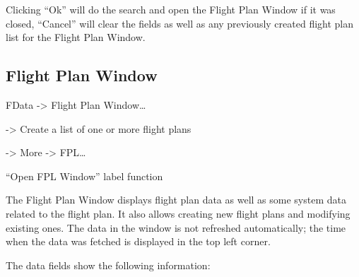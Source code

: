 \documentclass[a4paper,oneside,11pt]{memoir}
\begin{document}
Clicking “Ok” will do the search and open the Flight Plan Window if it was closed, “Cancel” will clear the fields as well as any previously created flight plan list for the Flight Plan Window.

\subsection{Flight Plan Window}
\label{win:fpw}

 FData -> Flight Plan Window… 

 -> Create a list of one or more flight plans 

 -> More -> FPL… 

“Open FPL Window” label function

\bigskip


The Flight Plan Window displays flight plan data as well as some system data related to the flight plan. It also allows creating new flight plans and modifying existing ones. The data in the window is not refreshed automatically; the time when the data was fetched is displayed in the top left corner.

\bigskip

The data fields show the following information:

\bigskip
\end{document}
